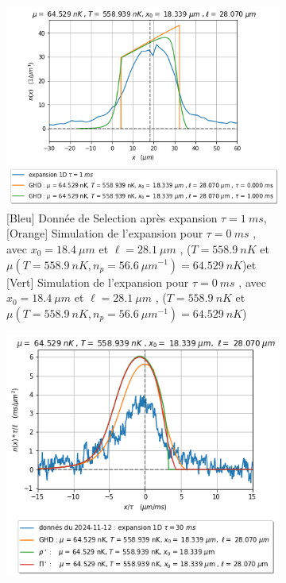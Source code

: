 \documentclass[a3, 10pt,twoside]{article}          %
\theoremstyle{plain}
\theoremstyle{definition}
\theoremstyle{remark}
\theoremstyle{definition} %
\begin{document}
	\begin{figure}[h]
			\begin{subfigure}[b]{0.45\textwidth}
        		\centering
        		\includegraphics[width=\textwidth]{Figures/simul_expansion_1_28}
        		\caption{{\color{blue}[Bleu] Donnée de Selection après expansion $\tau = 1~ms$},{\color{orange}[Orange]  Simulation de l'expansion pour $\tau= 0~ms$  , avec $x_0 = 18.4~\mu m$ et $\ell = 28.1~\mu m$ , ($T = 558.9 ~nK$ et $\mu( T = 558.9 ~nK , n_p = 56.6 ~{\mu m}^{-1} )= 64.529~nK$)}et {\color{OliveGreen}[Vert]  Simulation de l'expansion pour $\tau= 0~ms$  , avec $x_0 = 18.4~\mu m$ et $\ell = 28.1~\mu m$ , ($T = 558.9 ~nK$ et $\mu( T = 558.9 ~nK , n_p = 56.6 ~{\mu m}^{-1} )= 64.529~nK$)}   }
        		\label{fig:expansion_1_28}
    		\end{subfigure}
    		\hfill
    		\begin{subfigure}[b]{0.45\textwidth}
        		\centering
        		\includegraphics[width=\textwidth]{Figures/simul_expansion_30_28}

\end{subfigure}
\end{figure}
\end{document}

